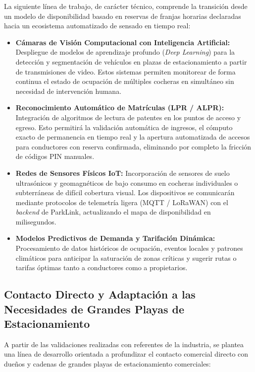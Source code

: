 La siguiente línea de trabajo, de carácter técnico, comprende la transición desde un modelo de disponibilidad basado en reservas de franjas horarias declaradas hacia un ecosistema automatizado de sensado en tiempo real:

\begin{itemize}
    \item \textbf{Cámaras de Visión Computacional con Inteligencia Artificial:} Despliegue de modelos de aprendizaje profundo (\textit{Deep Learning}) para la detección y segmentación de vehículos en plazas de estacionamiento a partir de transmisiones de video. Estos sistemas permiten monitorear de forma continua el estado de ocupación de múltiples cocheras en simultáneo sin necesidad de intervención humana.
    \item \textbf{Reconocimiento Automático de Matrículas (LPR / ALPR):} Integración de algoritmos de lectura de patentes en los puntos de acceso y egreso. Esto permitirá la validación automática de ingresos, el cómputo exacto de permanencia en tiempo real y la apertura automatizada de accesos para conductores con reserva confirmada, eliminando por completo la fricción de códigos PIN manuales.
    \item \textbf{Redes de Sensores Físicos IoT:} Incorporación de sensores de suelo ultrasónicos y geomagnéticos de bajo consumo en cocheras individuales o subterráneas de difícil cobertura visual. Los dispositivos se comunicarán mediante protocolos de telemetría ligera (MQTT / LoRaWAN) con el \textit{backend} de ParkLink, actualizando el mapa de disponibilidad en milisegundos.
    \item \textbf{Modelos Predictivos de Demanda y Tarifación Dinámica:} Procesamiento de datos históricos de ocupación, eventos locales y patrones climáticos para anticipar la saturación de zonas críticas y sugerir rutas o tarifas óptimas tanto a conductores como a propietarios.
\end{itemize}

\subsection{Contacto Directo y Adaptación a las Necesidades de Grandes Playas de Estacionamiento}

A partir de las validaciones realizadas con referentes de la industria, se plantea una línea de desarrollo orientada a profundizar el contacto comercial directo con dueños y cadenas de grandes playas de estacionamiento comerciales:

